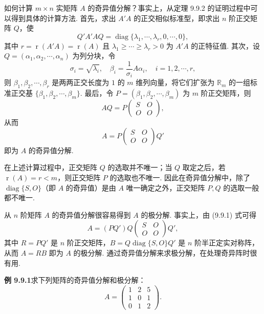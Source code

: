 \documentclass[UTF8,12pt,a4paper,fontset=fandol]{ctexart}
\begin{document}
如何计算 $m\times n$ 实矩阵 $A$ 的奇异值分解？事实上，从定理 9.9.2 的证明过程中可以得到具体的计算方法. 首先，求出 $A'A$ 的正交相似标准型，即求出 $n$ 阶正交矩阵 $Q$，使
\[
  Q'A'AQ=\operatorname{diag}\{\lambda_1,\cdots,\lambda_r,0,\cdots,0\},
\]
其中 $r=\operatorname{r}(A'A)=\operatorname{r}(A)$ 且 $\lambda_1\ge\cdots\ge\lambda_r>0$ 为 $A'A$ 的正特征值. 其次，设 $Q=(\alpha_1,\alpha_2,\cdots,\alpha_n)$ 为列分块，令
\[
  \sigma_i=\sqrt{\lambda_i},\quad \beta_i=\frac1{\sigma_i}A\alpha_i,\quad i=1,2,\cdots,r,
\]
则 $\beta_1,\beta_2,\cdots,\beta_r$ 是两两正交长度为 $1$ 的 $m$ 维列向量，将它们扩张为 $\mathbb R_m$ 的一组标准正交基 $\{\beta_1,\beta_2,\cdots,\beta_m\}$. 最后，令 $P=(\beta_1,\beta_2,\cdots,\beta_m)$ 为 $m$ 阶正交矩阵，则
\[
  AQ=P
  \left(\begin{array}{cc}
    S & O\\
    O & O
  \end{array}\right),
\]
从而
\begin{equation}
  A=P
  \left(\begin{array}{cc}
    S & O\\
    O & O
  \end{array}\right)Q'
  \tag{9.9.1}
\end{equation}
即为 $A$ 的奇异值分解.

在上述计算过程中，正交矩阵 $Q$ 的选取并不唯一；当 $Q$ 取定之后，若 $\operatorname{r}(A)=r<m$，则正交矩阵 $P$ 的选取也不唯一. 因此在奇异值分解中，除了 $\operatorname{diag}\{S,O\}$（即 $A$ 的奇异值）是由 $A$ 唯一确定之外，正交矩阵 $P,Q$ 的选取一般都不唯一.

从 $n$ 阶矩阵 $A$ 的奇异值分解很容易得到 $A$ 的极分解. 事实上，由 (9.9.1) 式可得
\begin{equation}
  A=(PQ')Q
  \left(\begin{array}{cc}
    S & O\\
    O & O
  \end{array}\right)Q',
  \tag{9.9.2}
\end{equation}
其中 $R=PQ'$ 是 $n$ 阶正交矩阵，$B=Q\operatorname{diag}\{S,O\}Q'$ 是 $n$ 阶半正定实对称阵，从而 $A=RB$ 即为 $A$ 的极分解. 通过奇异值分解来求极分解，在处理奇异阵时很有用.

\noindent\textbf{例 9.9.1}\quad 求下列矩阵的奇异值分解和极分解：
\[
  A=
  \left(\begin{array}{ccc}
    1 & 2 & 5\\
    1 & 0 & 1\\
    0 & 1 & 2
  \end{array}\right).
\]
\end{document}
